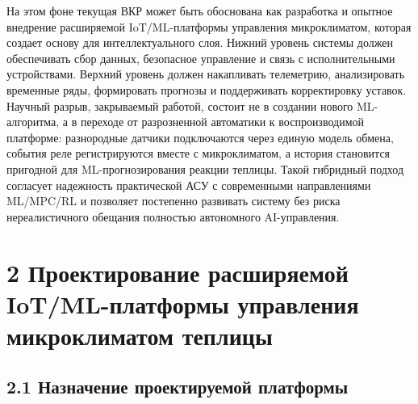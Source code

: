 \documentclass[a4paper,14pt]{extarticle}
\begin{document}
На этом фоне текущая ВКР может быть обоснована как разработка и опытное
внедрение расширяемой IoT/ML-платформы управления микроклиматом, которая
создает основу для интеллектуального слоя. Нижний уровень системы должен
обеспечивать сбор данных, безопасное управление и связь с
исполнительными устройствами. Верхний уровень должен накапливать
телеметрию, анализировать временные ряды, формировать прогнозы и
поддерживать корректировку уставок. Научный разрыв, закрываемый работой,
состоит не в создании нового ML-алгоритма, а в переходе от разрозненной
автоматики к воспроизводимой платформе: разнородные датчики подключаются
через единую модель обмена, события реле регистрируются вместе с
микроклиматом, а история становится пригодной для ML-прогнозирования
реакции теплицы. Такой гибридный подход согласует надежность
практической АСУ с современными направлениями ML/MPC/RL и позволяет
постепенно развивать систему без риска нереалистичного обещания
полностью автономного AI-управления.

\hypertarget{ux43fux440ux43eux435ux43aux442ux438ux440ux43eux432ux430ux43dux438ux435-ux440ux430ux441ux448ux438ux440ux44fux435ux43cux43eux439-iotml-ux43fux43bux430ux442ux444ux43eux440ux43cux44b-ux443ux43fux440ux430ux432ux43bux435ux43dux438ux44f-ux43cux438ux43aux440ux43eux43aux43bux438ux43cux430ux442ux43eux43c-ux442ux435ux43fux43bux438ux446ux44b}{%
\section{2 Проектирование расширяемой IoT/ML-платформы управления
микроклиматом
теплицы}\label{ux43fux440ux43eux435ux43aux442ux438ux440ux43eux432ux430ux43dux438ux435-ux440ux430ux441ux448ux438ux440ux44fux435ux43cux43eux439-iotml-ux43fux43bux430ux442ux444ux43eux440ux43cux44b-ux443ux43fux440ux430ux432ux43bux435ux43dux438ux44f-ux43cux438ux43aux440ux43eux43aux43bux438ux43cux430ux442ux43eux43c-ux442ux435ux43fux43bux438ux446ux44b}}

\hypertarget{ux43dux430ux437ux43dux430ux447ux435ux43dux438ux435-ux43fux440ux43eux435ux43aux442ux438ux440ux443ux435ux43cux43eux439-ux43fux43bux430ux442ux444ux43eux440ux43cux44b}{%
\subsection{2.1 Назначение проектируемой
платформы}\label{ux43dux430ux437ux43dux430ux447ux435ux43dux438ux435-ux43fux440ux43eux435ux43aux442ux438ux440ux443ux435ux43cux43eux439-ux43fux43bux430ux442ux444ux43eux440ux43cux44b}}
\end{document}

